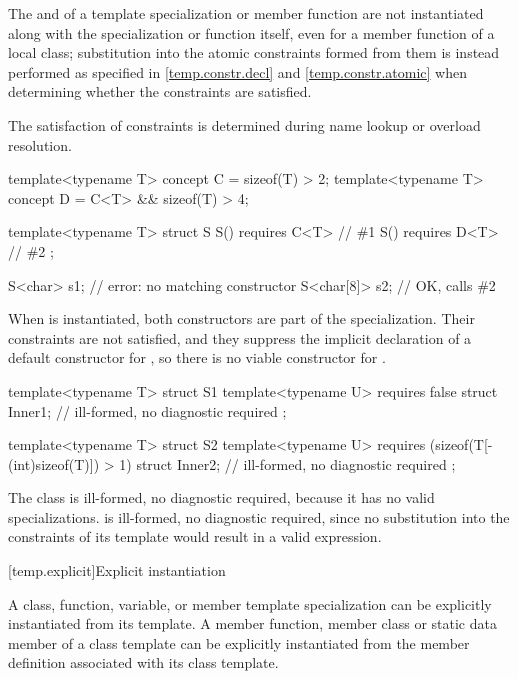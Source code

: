 \pnum
The  and 
of a template specialization or member function
are not instantiated along with the specialization or function itself,
even for a member function of a local class;
substitution into the atomic constraints formed from them is instead performed
as specified in \ref{temp.constr.decl} and \ref{temp.constr.atomic}
when determining whether the constraints are satisfied.
\begin{note}
The satisfaction of constraints is determined during name lookup or overload
resolution.
\end{note}
\begin{example}
\begin{codeblock}
template<typename T> concept C = sizeof(T) > 2;
template<typename T> concept D = C<T> && sizeof(T) > 4;

template<typename T> struct S {
  S() requires C<T> { }         // \#1
  S() requires D<T> { }         // \#2
};

S<char> s1;                     // error: no matching constructor
S<char[8]> s2;                  // OK, calls \#2
\end{codeblock}
When  is instantiated, both constructors are part of the
specialization. Their constraints are not satisfied, and
they suppress the implicit declaration of a default constructor for
, so there is no viable constructor
for .
\end{example}
\begin{example}
\begin{codeblock}
template<typename T> struct S1 {
  template<typename U>
    requires false
  struct Inner1;                // ill-formed, no diagnostic required
};

template<typename T> struct S2 {
  template<typename U>
    requires (sizeof(T[-(int)sizeof(T)]) > 1)
  struct Inner2;                // ill-formed, no diagnostic required
};
\end{codeblock}
The class  is ill-formed, no diagnostic required, because
it has no valid specializations.
 is ill-formed, no diagnostic required, since no substitution into
the constraints of its  template would result in a valid
expression.
\end{example}

[temp.explicit]{Explicit instantiation}

\pnum
{}%
%
A class, function, variable, or member template specialization can be explicitly
instantiated from its template.
A member function, member class or static data member of a class template can
be explicitly instantiated from the member definition associated with its class
template.

